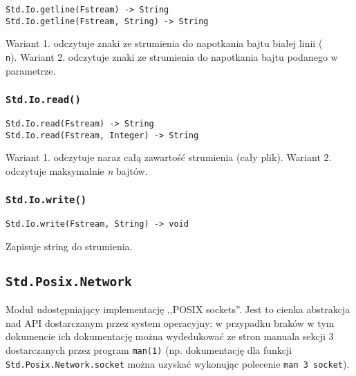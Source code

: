 \begin{small}
\begin{lstlisting}
Std.Io.getline(Fstream) -> String
Std.Io.getline(Fstream, String) -> String
\end{lstlisting}
\end{small}

Wariant 1. odczytuje znaki ze strumienia do napotkania bajtu białej linii (\texttt{\\n}).
Wariant 2. odczytuje znaki ze strumienia do napotkania bajtu podanego w parametrze.

\subsubsection{\texttt{Std.Io.read()}}

\begin{small}
\begin{lstlisting}
Std.Io.read(Fstream) -> String
Std.Io.read(Fstream, Integer) -> String
\end{lstlisting}
\end{small}

Wariant 1. odczytuje naraz całą zawartość strumienia (cały plik).
Wariant 2. odczytuje maksymalnie \emph{n} bajtów.

\subsubsection{\texttt{Std.Io.write()}}

\begin{small}
\begin{lstlisting}
Std.Io.write(Fstream, String) -> void
\end{lstlisting}
\end{small}

Zapisuje string do strumienia.

\subsection{\texttt{Std.Posix.Network}}
\label{stdlib_Std_Posix_Network}

Moduł udostępniający implementację ,,POSIX sockets''. Jest to cienka abstrakcja nad API dostarczanym przez
system operacyjny; w przypadku braków w tym dokumencie ich dokumentację można wydedukować ze stron manuala
sekcji 3 dostarczanych przez program \texttt{man(1)} (np. dokumentację dla funkcji
\texttt{Std.Posix.Network.socket} można uzyskać wykonując polecenie \texttt{man 3 socket}).

